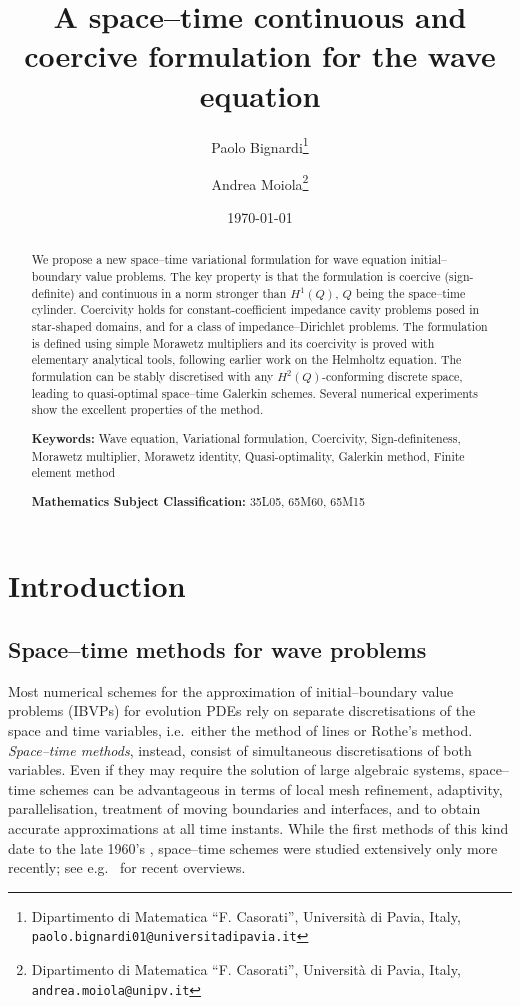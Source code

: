 \documentclass[a4paper]{article}
\title{A space--time continuous and coercive formulation for the wave equation}
\author{Paolo Bignardi\thanks{Dipartimento di Matematica ``F. Casorati'', Universit\`a di Pavia, Italy, \texttt{paolo.bignardi01@universitadipavia.it}}
    \and
    Andrea Moiola\thanks{Dipartimento di Matematica ``F. Casorati'', Universit\`a di Pavia, Italy, \texttt{andrea.moiola@unipv.it}}
}
\date{\today}
\theoremstyle{plain}
\theoremstyle{definition}
\begin{document}
\maketitle

\begin{abstract}
We propose a new space--time variational formulation for wave equation initial--boundary value problems.
The key property is that the formulation is coercive (sign-definite) and continuous in a norm stronger than $H^1(Q)$, $Q$ being the space--time cylinder.
Coercivity holds for constant-coefficient impedance cavity problems posed in star-shaped domains, and for a class of impedance--Dirichlet problems.
The formulation is defined using simple Morawetz multipliers and its coercivity is proved with elementary analytical tools, following earlier work on the Helmholtz equation.
The formulation can be stably discretised with any $H^2(Q)$-conforming discrete space, leading to quasi-optimal space--time Galerkin schemes.
Several numerical experiments show the excellent properties of the method.

\medskip
\textbf{Keywords:} \;
Wave equation,
Variational formulation,
Coercivity,
Sign-deﬁniteness,
Morawetz multiplier,
Morawetz identity,
Quasi-optimality,
Galerkin method,
Finite element method

\medskip
\textbf{Mathematics Subject Classification:} \; 35L05, 65M60, 65M15
\end{abstract}


\section{Introduction}
\subsection{Space--time methods for wave problems}

Most numerical schemes for the approximation of initial--boundary value problems (IBVPs) for evolution PDEs rely on separate discretisations of the space and time variables, i.e.\ either the method of lines or Rothe's method.
\emph{Space--time methods}, instead, consist of simultaneous discretisations of both variables.
Even if they may require the solution of large algebraic systems, space--time schemes can be advantageous in terms of local mesh refinement, adaptivity, parallelisation, treatment of moving boundaries and interfaces, and to obtain accurate approximations at all time instants.
While the first methods of this kind date to the late 1960's \cite{F1969,O1969},
space--time schemes were studied extensively only more recently; see e.g.\ \cite{LangerSteinbach2019,Oberwolfach22} for recent overviews.
\end{document}
